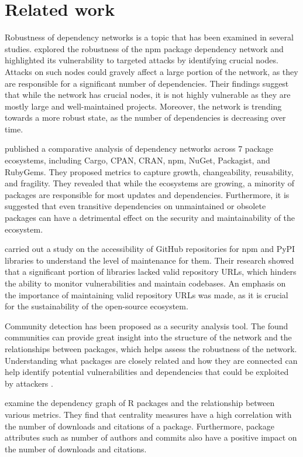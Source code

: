 \documentclass[9pt,twocolumn,twoside]{pnas-report}
\begin{document}
\section*{Related work}

Robustness of dependency networks is a topic that has been examined in several studies.
\cite{hafner2021robustness} explored the robustness of the npm package dependency network and highlighted its vulnerability to targeted attacks by identifying crucial nodes.
Attacks on such nodes could gravely affect a large portion of the network, as they are responsible for a significant number of dependencies.
Their findings suggest that while the network has crucial nodes, it is not highly vulnerable as they are mostly large and well-maintained projects.
Moreover, the network is trending towards a more robust state, as the number of dependencies is decreasing over time.

\cite{decan2018evolution} published a comparative analysis of dependency networks across 7 package ecosystems, including Cargo, CPAN, CRAN, npm, NuGet, Packagist, and RubyGems.
They proposed metrics to capture growth, changeability, reusability, and fragility.
They revealed that while the ecosystems are growing, a minority of packages are responsible for most updates and dependencies.
Furthermore, it is suggested that even transitive dependencies on unmaintained or obsolete packages can have a detrimental effect on the security and maintainability of the ecosystem.

\cite{tsakpinis2024accessibility} carried out a study on the accessibility of GitHub repositories for npm and PyPI libraries to understand the level of maintenance for them.
Their research showed that a significant portion of libraries lacked valid repository URLs, which hinders the ability to monitor vulnerabilities and maintain codebases.
An emphasis on the importance of maintaining valid repository URLs was made, as it is crucial for the sustainability of the open-source ecosystem.

Community detection has been proposed as a security analysis tool.
The found communities can provide great insight into the structure of the network and the relationships between packages, which helps assess the robustness of the network.
Understanding what packages are closely related and how they are connected can help identify potential vulnerabilities and dependencies that could be exploited by attackers \cite{hafner2021robustness, tsakpinis2024accessibility}.

\cite{korkmazrpackages} examine the dependency graph of R packages and the relationship between various metrics.
They find that centrality measures have a high correlation with the number of downloads and citations of a package.
Furthermore, package attributes such as number of authors and commits also have a positive impact on the number of downloads and citations.
\end{document}
